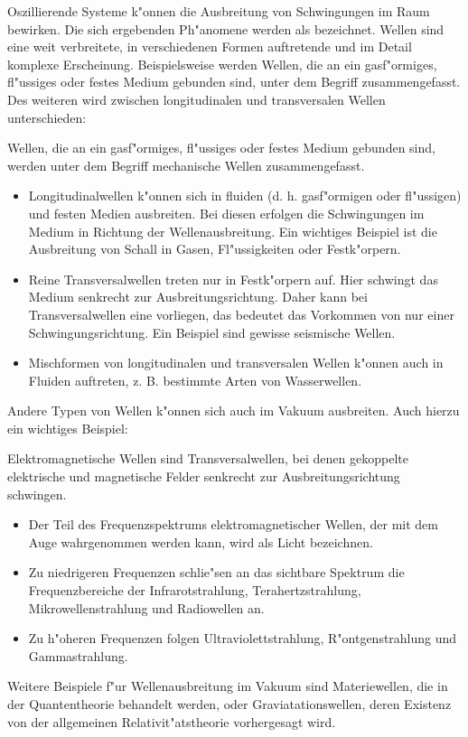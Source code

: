 \begin{MIntro}
Oszillierende Systeme k"onnen die Ausbreitung von Schwingungen im Raum bewirken. Die sich ergebenden Ph"anomene werden als  bezeichnet. Wellen sind eine weit verbreitete, in verschiedenen Formen auftretende und im Detail komplexe Erscheinung. Beispielsweise werden Wellen, die an ein gasf"ormiges, fl"ussiges oder festes Medium gebunden sind, unter dem Begriff  zusammengefasst. Des weiteren wird zwischen longitudinalen und transversalen Wellen unterschieden:
\begin{MInfo}
Wellen, die an ein gasf"ormiges, fl"ussiges oder festes Medium gebunden sind, werden unter dem Begriff mechanische Wellen zusammengefasst.
\begin{itemize}
  \item Longitudinalwellen k"onnen sich in fluiden (d. h. gasf"ormigen oder fl"ussigen) und festen Medien ausbreiten. Bei diesen erfolgen die Schwingungen im Medium in Richtung der Wellenausbreitung. Ein wichtiges Beispiel ist die Ausbreitung von Schall in Gasen, Fl"ussigkeiten oder Festk"orpern.
  \item Reine Transversalwellen treten nur in Festk"orpern auf. Hier schwingt das Medium senkrecht zur Ausbreitungsrichtung. Daher kann bei Transversalwellen eine  vorliegen, das bedeutet das Vorkommen von nur einer Schwingungsrichtung. Ein Beispiel sind gewisse seismische Wellen.
  \item Mischformen von longitudinalen und transversalen Wellen k"onnen auch in Fluiden auftreten, z. B. bestimmte Arten von Wasserwellen.
\end{itemize}
\end{MInfo}
Andere Typen von Wellen k"onnen sich auch im Vakuum ausbreiten. Auch hierzu ein wichtiges Beispiel:
\begin{MInfo}
Elektromagnetische Wellen sind Transversalwellen, bei denen gekoppelte elektrische und magnetische Felder senkrecht zur Ausbreitungsrichtung schwingen. 
\begin{itemize}
  \item Der Teil des Frequenzspektrums elektromagnetischer Wellen, der mit dem Auge wahrgenommen werden kann, wird als Licht bezeichnen.
  \item Zu niedrigeren Frequenzen schlie"sen an das sichtbare Spektrum die Frequenzbereiche der Infrarotstrahlung, Terahertzstrahlung, Mikrowellenstrahlung und Radiowellen an.
  \item Zu h"oheren Frequenzen folgen Ultraviolettstrahlung, R"ontgenstrahlung und Gammastrahlung.
\end{itemize}
\end{MInfo}
Weitere Beispiele f"ur Wellenausbreitung im Vakuum sind Materiewellen, die in der Quantentheorie behandelt werden, oder Graviatationswellen, deren Existenz von der allgemeinen Relativit"atstheorie vorhergesagt wird.


\end{MIntro}

